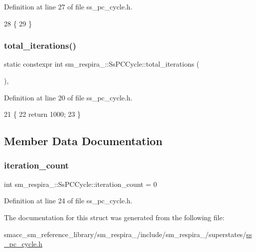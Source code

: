 Definition at line 27 of file ss\+\_\+pc\+\_\+cycle.\+h.


\begin{DoxyCode}
28   \{
29   \}
\end{DoxyCode}
\mbox{\label{structsm__respira__1_1_1SsPCCycle_a502cf54224fed364d076f60cb56c3741}} 
\subsubsection{\texorpdfstring{total\+\_\+iterations()}{total\_iterations()}}
{\footnotesize\ttfamily static constexpr int sm\+\_\+respira\+\_\+::\+Ss\+P\+C\+Cycle\+::total\+\_\+iterations (\begin{DoxyParamCaption}{ }\end{DoxyParamCaption})\hspace{0.3cm}{\ttfamily [inline]}, {\ttfamily [static]}}



Definition at line 20 of file ss\+\_\+pc\+\_\+cycle.\+h.


\begin{DoxyCode}
21   \{
22     \textcolor{keywordflow}{return} 1000;
23   \}
\end{DoxyCode}


\subsection{Member Data Documentation}
\mbox{\label{structsm__respira__1_1_1SsPCCycle_a57d8a8bbc591183dcf194ac46d1f3a7f}} 
\subsubsection{\texorpdfstring{iteration\+\_\+count}{iteration\_count}}
{\footnotesize\ttfamily int sm\+\_\+respira\+\_\+::\+Ss\+P\+C\+Cycle\+::iteration\+\_\+count = 0}



Definition at line 24 of file ss\+\_\+pc\+\_\+cycle.\+h.



The documentation for this struct was generated from the following file\+:\begin{DoxyCompactItemize}
\item 
smacc\+\_\+sm\+\_\+reference\+\_\+library/sm\+\_\+respira\+\_/include/sm\+\_\+respira\+\_/superstates/\hyperlink{ss__pc__cycle_8h}{ss\+\_\+pc\+\_\+cycle.\+h}\end{DoxyCompactItemize}
